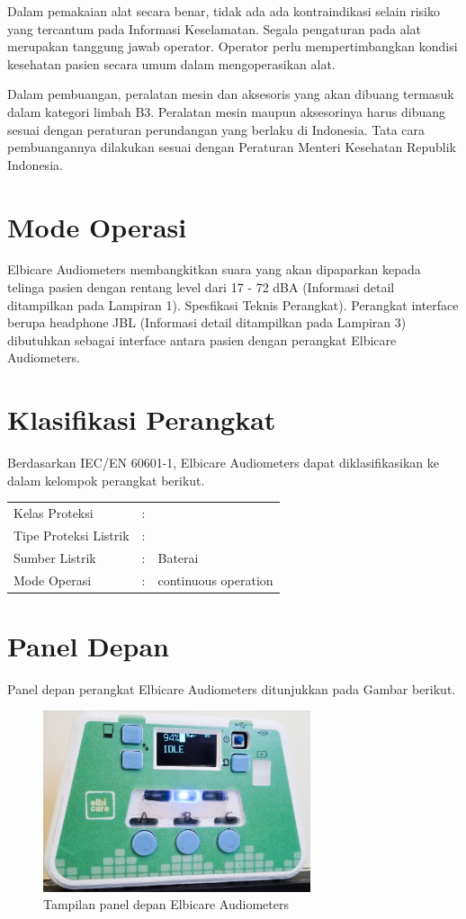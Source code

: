 \documentclass[11pt,a4paper,twoside,onecolumn]{book}
\begin{document}
		Dalam pemakaian alat secara benar, tidak ada ada kontraindikasi selain risiko yang tercantum pada Informasi Keselamatan. Segala pengaturan pada alat merupakan tanggung jawab operator. Operator perlu mempertimbangkan kondisi kesehatan pasien secara umum dalam mengoperasikan alat.
		
		Dalam pembuangan, peralatan mesin dan aksesoris yang akan dibuang termasuk dalam kategori limbah B3. Peralatan mesin maupun aksesorinya harus dibuang sesuai dengan peraturan perundangan yang berlaku di Indonesia. Tata cara pembuangannya dilakukan sesuai dengan Peraturan Menteri Kesehatan Republik Indonesia.
		
		\section{Mode Operasi}
		Elbicare Audiometers membangkitkan suara yang akan dipaparkan kepada telinga pasien dengan rentang level dari 17 - 72 dBA (Informasi detail ditampilkan pada Lampiran 1). Spesfikasi Teknis Perangkat). Perangkat interface berupa headphone JBL (Informasi detail ditampilkan pada Lampiran 3) dibutuhkan sebagai interface antara pasien dengan perangkat Elbicare Audiometers. 
		
		\section{Klasifikasi Perangkat}
		Berdasarkan IEC/EN 60601-1, Elbicare Audiometers dapat diklasifikasikan ke dalam kelompok perangkat berikut.
		
		\begin{tabular}{lcl}
			Kelas Proteksi & : & \\
			Tipe Proteksi Listrik & : & \\
			Sumber Listrik & : & Baterai\\
			Mode Operasi & : & continuous operation\\
		\end{tabular}
			 
		
		\section{Panel Depan}
		Panel depan perangkat Elbicare Audiometers ditunjukkan pada Gambar berikut.
		\begin{figure}[H]
			\centering
			\includegraphics[width=0.7\textwidth]{images/depan-idle}
			\caption{Tampilan panel depan Elbicare Audiometers}
		\end{figure}
		
\end{document}
